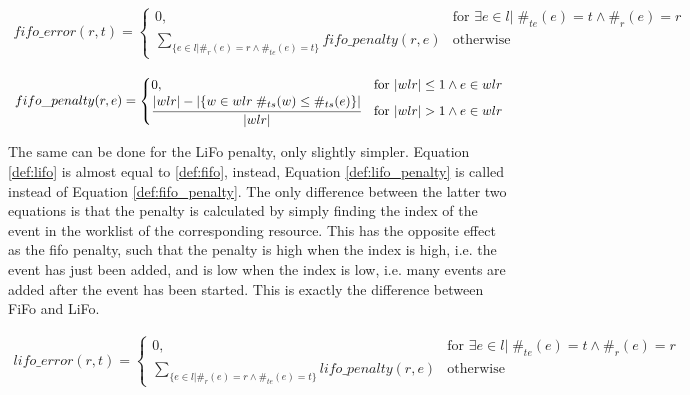 \begin{equation}\label{def:fifo}
  \begin{array}{l}
    fifo\_error(r, t) = 
    
    \begin{cases}
    	0, & \text{for } \exists{e \in l} | \; \#_{te}(e) = t \wedge \#_r(e)=r \\
        \sum_{\{e \in l | \#_{r}(e)=r \wedge \#_{te}(e)=t \}} fifo\_penalty(r,e)  & \text{otherwise}
    \end{cases}
  \end{array}
\end{equation}


\begin{equation}\label{def:fifo_penalty}
  \begin{array}{l}
    fifo\_penalty(r, e) = 
    \begin{cases}
    	0, & \text{for } |wlr| \leq 1 \wedge e \in wlr  \\
        \cfrac{|wlr| - |\{w \in wlr\; \#_{ts}(w)  \leq \#_{ts}(e)\}|}{|wlr|}  & \text{for } |wlr| > 1 \wedge e \in wlr
    \end{cases}
  \end{array}
\end{equation}

The same can be done for the LiFo penalty, only slightly simpler. Equation \ref{def:lifo} is almost equal to \ref{def:fifo}, instead, Equation \ref{def:lifo_penalty} is called instead of Equation \ref{def:fifo_penalty}. The only difference between the latter two equations is that the penalty is calculated by simply finding the index of the event in the worklist of the corresponding resource. This has the opposite effect as the fifo penalty, such that the penalty is high when the index is high, i.e. the event has just been added, and is low when the index is low, i.e. many events are added after the event has been started. This is exactly the difference between FiFo and LiFo. 

\begin{equation}\label{def:lifo}
  \begin{array}{l}
    lifo\_error(r, t) = 
    
    \begin{cases}
    	0, & \text{for } \exists{e \in l} | \; \#_{te}(e) = t \wedge \#_{r}(e)=r \\
        \sum_{\{e \in l | \#_{r}(e)=r \wedge \#_{te}(e)=t\}} lifo\_penalty(r,e)  & \text{otherwise}
    \end{cases}
  \end{array}
\end{equation}


